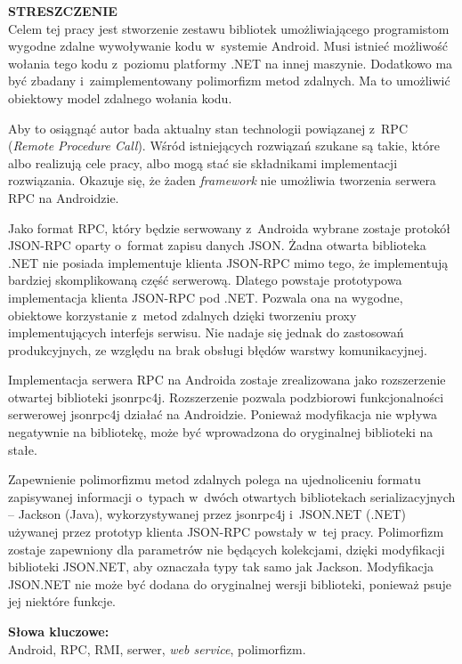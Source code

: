 \documentclass[twoside,a4paper]{book}
\begin{document}



{\noindent \large \textbf{STRESZCZENIE}} \\
Celem tej pracy jest stworzenie zestawu bibliotek umożliwiającego programistom wygodne zdalne wywoływanie kodu w~systemie Android. Musi istnieć możliwość wołania tego kodu z~poziomu platformy .NET na innej maszynie.
Dodatkowo ma być zbadany i~zaimplementowany polimorfizm metod zdalnych.
Ma to umożliwić obiektowy model zdalnego wołania kodu.

Aby to osiągnąć autor bada aktualny stan technologii powiązanej z~RPC (\emph{Remote Procedure Call}).
Wśród istniejących rozwiązań szukane są takie, które albo realizują cele pracy, albo mogą stać sie składnikami implementacji rozwiązania.
Okazuje się, że żaden \emph{framework} nie umożliwia tworzenia serwera RPC na Androidzie.

Jako format RPC, który będzie serwowany z~Androida wybrane zostaje protokół JSON-RPC oparty o~format zapisu danych JSON.
Żadna otwarta biblioteka .NET nie posiada implementuje klienta JSON-RPC mimo tego, że implementują bardziej skomplikowaną część serwerową.
Dlatego powstaje prototypowa implementacja klienta JSON-RPC pod .NET. Pozwala ona na wygodne, obiektowe korzystanie z~metod zdalnych dzięki tworzeniu proxy implementujących interfejs serwisu.
Nie nadaje się jednak do zastosowań produkcyjnych, ze względu na brak obsługi błędów warstwy komunikacyjnej.

Implementacja serwera RPC na Androida zostaje zrealizowana jako rozszerzenie otwartej biblioteki jsonrpc4j.
Rozszerzenie pozwala podzbiorowi funkcjonalności serwerowej jsonrpc4j działać na Androidzie.
Ponieważ modyfikacja nie wpływa negatywnie na bibliotekę, może być wprowadzona do oryginalnej biblioteki na stałe.

Zapewnienie polimorfizmu metod zdalnych polega na ujednoliceniu formatu zapisywanej informacji o~typach w~dwóch otwartych bibliotekach serializacyjnych -- Jackson (Java), wykorzystywanej przez jsonrpc4j i~JSON.NET (.NET) używanej przez prototyp klienta JSON-RPC powstały w~tej pracy.
Polimorfizm zostaje zapewniony dla parametrów nie będących kolekcjami, dzięki modyfikacji biblioteki JSON.NET, aby oznaczała typy tak samo jak Jackson.
Modyfikacja JSON.NET nie może być dodana do oryginalnej wersji biblioteki, ponieważ psuje jej niektóre funkcje.

\noindent\textbf{Słowa kluczowe:} \\
Android, RPC, RMI, serwer, \emph{web service}, polimorfizm.
\clearpage
\end{document}
